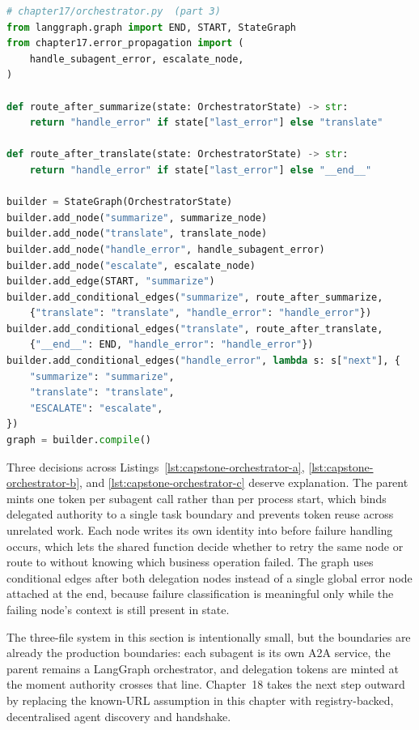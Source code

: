\begin{lstlisting}[language=Python,
  caption={Graph routing for success, retry, and escalation},
  label={lst:capstone-orchestrator-c}]
# chapter17/orchestrator.py  (part 3)
from langgraph.graph import END, START, StateGraph
from chapter17.error_propagation import (
    handle_subagent_error, escalate_node,
)

def route_after_summarize(state: OrchestratorState) -> str:
    return "handle_error" if state["last_error"] else "translate"

def route_after_translate(state: OrchestratorState) -> str:
    return "handle_error" if state["last_error"] else "__end__"

builder = StateGraph(OrchestratorState)
builder.add_node("summarize", summarize_node)
builder.add_node("translate", translate_node)
builder.add_node("handle_error", handle_subagent_error)
builder.add_node("escalate", escalate_node)
builder.add_edge(START, "summarize")
builder.add_conditional_edges("summarize", route_after_summarize,
    {"translate": "translate", "handle_error": "handle_error"})
builder.add_conditional_edges("translate", route_after_translate,
    {"__end__": END, "handle_error": "handle_error"})
builder.add_conditional_edges("handle_error", lambda s: s["next"], {
    "summarize": "summarize",
    "translate": "translate",
    "ESCALATE": "escalate",
})
graph = builder.compile()
\end{lstlisting}

Three decisions across Listings~\ref{lst:capstone-orchestrator-a},
\ref{lst:capstone-orchestrator-b}, and
\ref{lst:capstone-orchestrator-c} deserve explanation.
The parent mints one token per subagent call rather than per process start,
which binds delegated authority to a single task boundary and prevents
token reuse across unrelated work. Each node writes its own identity into
 before failure handling occurs, which lets the shared
 function decide whether to retry the same
node or route to  without knowing which business operation
failed. The graph uses conditional edges after both delegation nodes
instead of a single global error node attached at the end, because failure
classification is meaningful only while the failing node's context is still
present in state.

The three-file system in this section is intentionally small, but the
boundaries are already the production boundaries: each subagent is its own
A2A service, the parent remains a LangGraph orchestrator, and delegation
tokens are minted at the moment authority crosses that line. Chapter~18
takes the next step outward by replacing the known-URL assumption in this
chapter with registry-backed, decentralised agent discovery and handshake.
